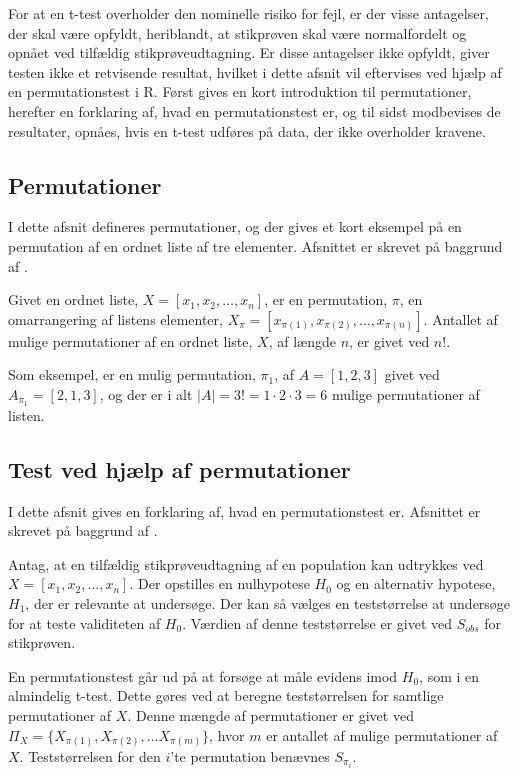 \documentclass[
]{book}
\theoremstyle{definition}
\theoremstyle{definition}
\theoremstyle{definition}
\theoremstyle{remark}
\begin{document}
For at en t-test overholder den nominelle risiko for fejl, er der visse antagelser, der skal være opfyldt, heriblandt, at stikprøven skal være normalfordelt og opnået ved tilfældig stikprøveudtagning. Er disse antagelser ikke opfyldt, giver testen ikke et retvisende resultat, hvilket i dette afsnit vil eftervises ved hjælp af en permutationstest i R. Først gives en kort introduktion til permutationer, herefter en forklaring af, hvad en permutationstest er, og til sidst modbevises de resultater, opnåes, hvis en t-test udføres på data, der ikke overholder kravene.

\hypertarget{permutationer}{%
\subsection{Permutationer}\label{permutationer}}

I dette afsnit defineres permutationer, og der gives et kort eksempel på en permutation af en ordnet liste af tre elementer. Afsnittet er skrevet på baggrund af \citep{Permutationer}.

Givet en ordnet liste, \(X = [x_1, x_2, \ldots, x_n ]\), er en permutation, \(\pi\), en omarrangering af listens elementer, \(X_\pi = [x_{\pi(1)}, x_{\pi(2)}, \ldots, x_{\pi(n)}]\). Antallet af mulige permutationer af en ordnet liste, \(X\), af længde \(n\), er givet ved \(n!\).

Som eksempel, er en mulig permutation, \(\pi_1\), af \(A = [1, 2, 3]\) givet ved \(A_{\pi_1} = [2, 1, 3]\), og der er i alt \(|A| = 3! = 1 \cdot 2 \cdot 3 = 6\) mulige permutationer af listen.

\hypertarget{test-ved-hjuxe6lp-af-permutationer}{%
\subsection{Test ved hjælp af permutationer}\label{test-ved-hjuxe6lp-af-permutationer}}

I dette afsnit gives en forklaring af, hvad en permutationstest er. Afsnittet er skrevet på baggrund af \citep{Permutationstest}.

Antag, at en tilfældig stikprøveudtagning af en population kan udtrykkes ved \(X = [x_1, x_2, \ldots, x_n]\). Der opstilles en nulhypotese \(H_0\) og en alternativ hypotese, \(H_1\), der er relevante at undersøge. Der kan så vælges en teststørrelse at undersøge for at teste validiteten af \(H_0\). Værdien af denne teststørrelse er givet ved \(S_{obs}\) for stikprøven.

En permutationstest går ud på at forsøge at måle evidens imod \(H_0\), som i en almindelig t-test. Dette gøres ved at beregne teststørrelsen for samtlige permutationer af \(X\). Denne mængde af permutationer er givet ved \(\Pi_X = \{X_{\pi(1)}, X_{\pi(2)}, \ldots X_{\pi(m)} \}\), hvor \(m\) er antallet af mulige permutationer af \(X\). Teststørrelsen for den \(i\)'te permutation benævnes \(S_{\pi_i}\).
\end{document}
